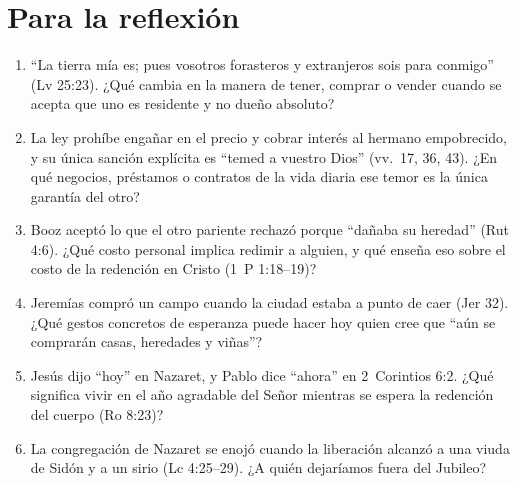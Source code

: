 \documentclass[11pt,letterpaper]{article}
\begin{document}
\section{Para la reflexión}
\begin{enumerate}\setlength{\itemsep}{2pt}
\item ``La tierra mía es; pues vosotros forasteros y extranjeros sois para conmigo'' (Lv 25:23). ¿Qué cambia en la manera de tener, comprar o vender cuando se acepta que uno es residente y no dueño absoluto?
\item La ley prohíbe engañar en el precio y cobrar interés al hermano empobrecido, y su única sanción explícita es ``temed a vuestro Dios'' (vv.~17, 36, 43). ¿En qué negocios, préstamos o contratos de la vida diaria ese temor es la única garantía del otro?
\item Booz aceptó lo que el otro pariente rechazó porque ``dañaba su heredad'' (Rut 4:6). ¿Qué costo personal implica redimir a alguien, y qué enseña eso sobre el costo de la redención en Cristo (1~P 1:18--19)?
\item Jeremías compró un campo cuando la ciudad estaba a punto de caer (Jer 32). ¿Qué gestos concretos de esperanza puede hacer hoy quien cree que ``aún se comprarán casas, heredades y viñas''?
\item Jesús dijo ``hoy'' en Nazaret, y Pablo dice ``ahora'' en 2~Corintios 6:2. ¿Qué significa vivir en el año agradable del Señor mientras se espera la redención del cuerpo (Ro 8:23)?
\item La congregación de Nazaret se enojó cuando la liberación alcanzó a una viuda de Sidón y a un sirio (Lc 4:25--29). ¿A quién dejaríamos fuera del Jubileo?
\end{enumerate}

\end{document}
